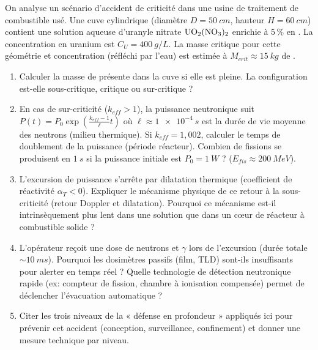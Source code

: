 \documentclass[11pt]{article}
\begin{document}
\begin{exercice}
On analyse un scénario d'accident de criticité dans une usine de traitement de combustible usé. Une cuve cylindrique (diamètre $D = \SI{50}{cm}$, hauteur $H = \SI{60}{cm}$) contient une solution aqueuse d'uranyle nitrate $\ce{UO2(NO3)2}$ enrichie à $5\,\%$ en . La concentration en uranium est $C_U = \SI{400}{g/L}$. La masse critique pour cette géométrie et concentration (réfléchi par l'eau) est estimée à $M_{crit} \approx \SI{15}{kg}$ de .
\begin{enumerate}
    \item Calculer la masse de  présente dans la cuve si elle est pleine. La configuration est-elle sous-critique, critique ou sur-critique ?
    \item En cas de sur-criticité ($k_{eff} > 1$), la puissance neutronique suit $P(t) = P_0 \exp\left(\frac{k_{eff}-1}{\ell}t\right)$ où $\ell \approx \SI{1e-4}{s}$ est la durée de vie moyenne des neutrons (milieu thermique). Si $k_{eff} = 1,002$, calculer le temps de doublement de la puissance (période réacteur). Combien de fissions se produisent en $\SI{1}{s}$ si la puissance initiale est $P_0 = \SI{1}{W}$ ? ($E_{fis} \approx \SI{200}{MeV}$).
    \item L'excursion de puissance s'arrête par dilatation thermique (coefficient de réactivité $\alpha_T < 0$). Expliquer le mécanisme physique de ce retour à la sous-criticité (retour Doppler et dilatation). Pourquoi ce mécanisme est-il intrinsèquement plus lent dans une solution que dans un cœur de réacteur à combustible solide ?
    \item L'opérateur reçoit une dose de neutrons et $\gamma$ lors de l'excursion (durée totale $\sim \SI{10}{ms}$). Pourquoi les dosimètres passifs (film, TLD) sont-ils insuffisants pour alerter en temps réel ? Quelle technologie de détection neutronique rapide (ex: compteur de fission, chambre à ionisation compensée) permet de déclencher l'évacuation automatique ?
    \item Citer les trois niveaux de la « défense en profondeur » appliqués ici pour prévenir cet accident (conception, surveillance, confinement) et donner une mesure technique par niveau.
\end{enumerate}
\end{exercice}
\end{document}
